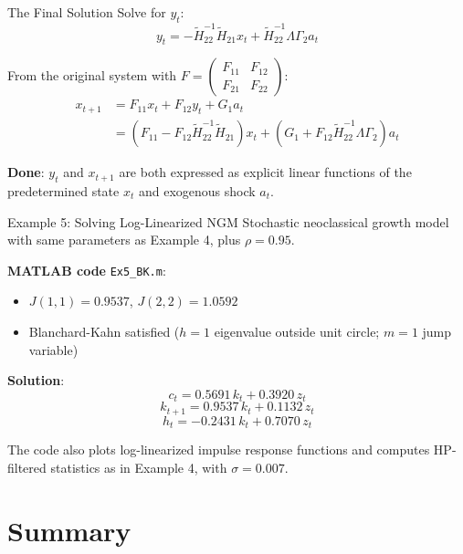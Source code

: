 \documentclass[blue]{beamer}
\begin{document}
\begin{frame}{The Final Solution}
	Solve for $y_t$:
	\[
	y_t = -\tilde{H}_{22}^{-1} \tilde{H}_{21} x_t + \tilde{H}_{22}^{-1} \Lambda \Gamma_2 a_t
	\]
	

	From the original system with $F = \begin{pmatrix} F_{11} & F_{12} \\ F_{21} & F_{22} \end{pmatrix}$:
	\[
	\begin{array}{ll}
	x_{t+1} &= F_{11} x_t + F_{12} y_t + G_1 a_t\\& = (F_{11} - F_{12} \tilde{H}_{22}^{-1} \tilde{H}_{21}) x_t + (G_1 + F_{12} \tilde{H}_{22}^{-1} \Lambda \Gamma_2) a_t
	\end{array}
	\]
	

	\textbf{Done}: $y_t$ and $x_{t+1}$ are both expressed as explicit linear functions of the predetermined state $x_t$ and exogenous shock $a_t$.
\end{frame}

\begin{frame}{Example 5: Solving Log-Linearized NGM}
	Stochastic neoclassical growth model with same parameters as Example 4, plus $\rho = 0.95$.
	

	\textbf{MATLAB code} \texttt{Ex5\_BK.m}:
	\begin{itemize}
		\item $J(1,1) = 0.9537$, $J(2,2) = 1.0592$
		\item Blanchard-Kahn satisfied ($h = 1$ eigenvalue outside unit circle; $m = 1$ jump variable)
	\end{itemize}
	

	\textbf{Solution}:
	\[
	c_t = 0.5691\, k_t + 0.3920\, z_t
	\]
	\[
	k_{t+1} = 0.9537\, k_t + 0.1132\, z_t
	\]
	\[
	h_t = -0.2431\, k_t + 0.7070\, z_t
	\]
	
	\bigskip
	The code also plots log-linearized impulse response functions and computes HP-filtered statistics as in Example 4, with $\sigma = 0.007$.
\end{frame}


\section{Summary}
\end{document}
